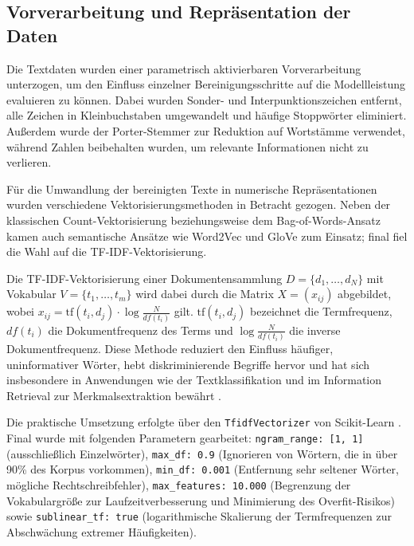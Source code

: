 \subsection{Vorverarbeitung und Repräsentation der Daten}
\label{sec:vorverarbeitung}

Die Textdaten wurden einer parametrisch aktivierbaren Vorverarbeitung unterzogen, um den Einfluss einzelner Bereinigungsschritte auf die Modellleistung evaluieren zu können. Dabei wurden Sonder- und Interpunktionszeichen entfernt, alle Zeichen in Kleinbuchstaben umgewandelt und häufige Stoppwörter eliminiert. Außerdem wurde der Porter-Stemmer \cite{Porter2006} zur Reduktion auf Wortstämme verwendet, während Zahlen beibehalten wurden, um relevante Informationen nicht zu verlieren.

Für die Umwandlung der bereinigten Texte in numerische Repräsentationen wurden verschiedene Vektorisierungsmethoden in Betracht gezogen. Neben der klassischen Count-Vektorisierung beziehungsweise dem Bag-of-Words-Ansatz kamen auch semantische Ansätze wie Word2Vec \cite{Mikolov2013} und GloVe \cite{Pennington2014} zum Einsatz; final fiel die Wahl auf die TF-IDF-Vektorisierung.

Die TF-IDF-Vektorisierung einer Dokumentensammlung $D = \{d_1, \dots, d_N\}$ mit Vokabular $V = \{t_1, \dots, t_m\}$ wird dabei durch die Matrix $X = (x_{ij})$ abgebildet, wobei $x_{ij} = \mathrm{tf}(t_i,d_j) \cdot \log\frac{N}{df(t_i)}$ gilt. $\mathrm{tf}(t_i,d_j)$ bezeichnet die Termfrequenz, $df(t_i)$ die Dokumentfrequenz des Terms und $\log\frac{N}{df(t_i)}$ die inverse Dokumentfrequenz. Diese Methode reduziert den Einfluss häufiger, uninformativer Wörter, hebt diskriminierende Begriffe hervor und hat sich insbesondere in Anwendungen wie der Textklassifikation und im Information Retrieval zur Merkmalsextraktion bewährt \cite{Manning2009}.

Die praktische Umsetzung erfolgte über den \texttt{TfidfVectorizer} von Scikit-Learn \cite{Pedregosa2011}. Final wurde mit folgenden Parametern gearbeitet: \texttt{ngram\_range: [1, 1]} (ausschließlich Einzelwörter), \texttt{max\_df: 0.9} (Ignorieren von Wörtern, die in über 90\% des Korpus vorkommen), \texttt{min\_df: 0.001} (Entfernung sehr seltener Wörter, mögliche Rechtschreibfehler), \texttt{max\_features: 10.000} (Begrenzung der Vokabulargröße zur Laufzeitverbesserung und Minimierung des Overfit-Risikos) sowie \texttt{sublinear\_tf: true} (logarithmische Skalierung der Termfrequenzen zur Abschwächung extremer Häufigkeiten).
